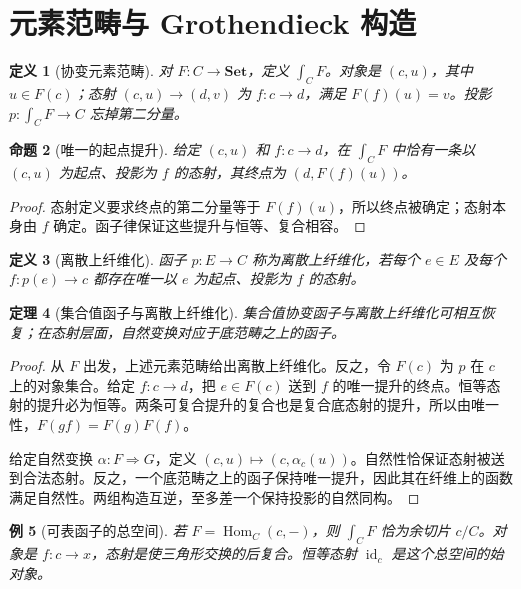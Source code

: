 \documentclass[12pt,oneside,openany,fontset=none]{ctexbook}
\theoremstyle{cn}
\newtheorem{definition}{定义}[chapter]
\newtheorem{example}[definition]{例}
\newtheorem{proposition}[definition]{命题}
\newtheorem{theorem}[definition]{定理}
\numberwithin{equation}{chapter}
\newcommand{\Set}{\mathbf{Set}}
\newcommand{\id}{\operatorname{id}}
\newcommand{\Hom}{\operatorname{Hom}}
\begin{document}
\section{元素范畴与 Grothendieck 构造}
\begin{definition}[协变元素范畴]
对 $F:C\to\Set$，定义 $\int_C F$。对象是 $(c,u)$，其中 $u\in F(c)$；态射 $(c,u)\to(d,v)$ 为 $f:c\to d$，满足 $F(f)(u)=v$。投影 $p:\int_CF\to C$ 忘掉第二分量。
\end{definition}
\begin{proposition}[唯一的起点提升]
给定 $(c,u)$ 和 $f:c\to d$，在 $\int_CF$ 中恰有一条以 $(c,u)$ 为起点、投影为 $f$ 的态射，其终点为 $(d,F(f)(u))$。
\end{proposition}
\begin{proof}
态射定义要求终点的第二分量等于 $F(f)(u)$，所以终点被确定；态射本身由 $f$ 确定。函子律保证这些提升与恒等、复合相容。
\end{proof}
\begin{definition}[离散上纤维化]
函子 $p:E\to C$ 称为离散上纤维化，若每个 $e\in E$ 及每个 $f:p(e)\to c$ 都存在唯一以 $e$ 为起点、投影为 $f$ 的态射。
\end{definition}
\begin{theorem}[集合值函子与离散上纤维化]
集合值协变函子与离散上纤维化可相互恢复；在态射层面，自然变换对应于底范畴之上的函子。
\end{theorem}
\begin{proof}
从 $F$ 出发，上述元素范畴给出离散上纤维化。反之，令 $F(c)$ 为 $p$ 在 $c$ 上的对象集合。给定 $f:c\to d$，把 $e\in F(c)$ 送到 $f$ 的唯一提升的终点。恒等态射的提升必为恒等。两条可复合提升的复合也是复合底态射的提升，所以由唯一性，$F(gf)=F(g)F(f)$。

给定自然变换 $\alpha:F\Rightarrow G$，定义 $(c,u)\mapsto(c,\alpha_c(u))$。自然性恰保证态射被送到合法态射。反之，一个底范畴之上的函子保持唯一提升，因此其在纤维上的函数满足自然性。两组构造互逆，至多差一个保持投影的自然同构。
\end{proof}
\begin{example}[可表函子的总空间]
若 $F=\Hom_C(c,-)$，则 $\int_CF$ 恰为余切片 $c/C$。对象是 $f:c\to x$，态射是使三角形交换的后复合。恒等态射 $\id_c$ 是这个总空间的始对象。
\end{example}
\end{document}
